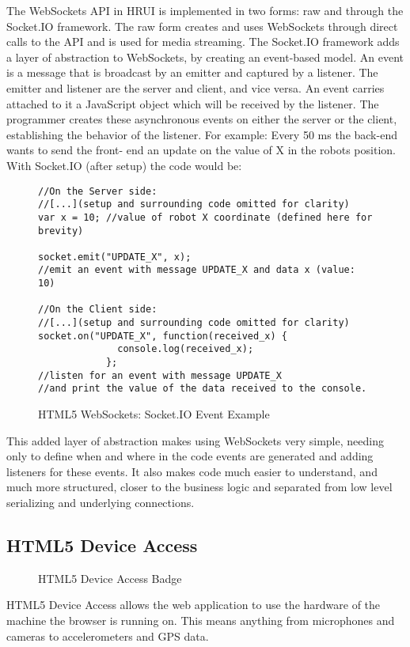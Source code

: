The WebSockets API in HRUI is implemented in two forms: raw and through the Socket.IO framework. The raw form creates and uses
WebSockets through direct calls to the API and is used for media streaming. The Socket.IO framework adds a layer of
abstraction to WebSockets, by creating an event-based model. An event is a message that is broadcast by an emitter and
captured by a listener. The emitter and listener are the server and client, and vice versa. An event carries attached to it a
JavaScript object which will be received by the listener. The programmer creates these asynchronous events on either the
server or the client, establishing the behavior of the listener. For example: Every 50 ms the back-end wants to send the front-
end an update on the value of X in the robots position. With Socket.IO (after setup) the code would be:\\

\begin{figure}[h]
\centering
{}
\begin{verbatim}
//On the Server side:
//[...](setup and surrounding code omitted for clarity)
var x = 10; //value of robot X coordinate (defined here for brevity)

socket.emit("UPDATE_X", x);
//emit an event with message UPDATE_X and data x (value: 10)

//On the Client side:
//[...](setup and surrounding code omitted for clarity)
socket.on("UPDATE_X", function(received_x) {
              console.log(received_x);
            };
//listen for an event with message UPDATE_X
//and print the value of the data received to the console.
\end{verbatim}
\caption{HTML5 WebSockets: Socket.IO Event Example}
\end{figure}
This added layer of abstraction makes using WebSockets very simple, needing only to define when and where in the code events
are generated and adding listeners for these events. It also makes code much easier to understand, and much more structured,
closer to the business logic and separated from low level serializing and underlying connections.
\subsection{HTML5 Device Access}
\begin{figure}[h]
\centering

\caption{HTML5 Device Access Badge}
\end{figure}
HTML5 Device Access allows the web application to use the hardware of the machine the browser is running on. This means
anything from microphones and cameras to accelerometers and GPS data.\\

